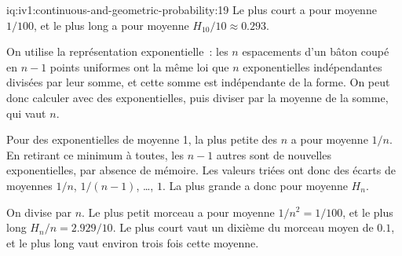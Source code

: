 \begin{solution}{iq:iv1:continuous-and-geometric-probability:19}
Le plus court a pour moyenne $1/100$, et le plus long a pour moyenne $H_{10}/10 \approx 0.293$.

On utilise la représentation exponentielle~: les $n$ espacements d'un bâton coupé en $n - 1$ points uniformes ont la même loi que $n$ exponentielles indépendantes divisées par leur somme, et cette somme est indépendante de la forme. On peut donc calculer avec des exponentielles, puis diviser par la moyenne de la somme, qui vaut $n$.

Pour des exponentielles de moyenne 1, la plus petite des $n$ a pour moyenne $1/n$. En retirant ce minimum à toutes, les $n - 1$ autres sont de nouvelles exponentielles, par absence de mémoire. Les valeurs triées ont donc des écarts de moyennes $1/n$, $1/(n-1)$, \dots, $1$. La plus grande a donc pour moyenne $H_n$.

On divise par $n$. Le plus petit morceau a pour moyenne $1/n^2 = 1/100$, et le plus long $H_n/n = 2.929/10$. Le plus court vaut un dixième du morceau moyen de $0.1$, et le plus long vaut environ trois fois cette moyenne.

\end{solution}

